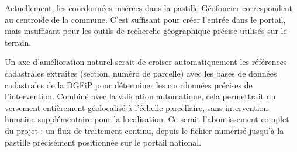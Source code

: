 Actuellement, les coordonnées insérées dans la pastille Géofoncier correspondent au centroïde de la commune. C'est suffisant pour créer l'entrée dans le portail, mais insuffisant pour les outils de recherche géographique précise utilisés sur le terrain.

Un axe d'amélioration naturel serait de croiser automatiquement les références cadastrales extraites (section, numéro de parcelle) avec les bases de données cadastrales de la DGFiP pour déterminer les coordonnées précises de l'intervention. Combiné avec la validation automatique, cela permettrait un versement entièrement géolocalisé à l'échelle parcellaire, sans intervention humaine supplémentaire pour la localisation. Ce serait l'aboutissement complet du projet : un flux de traitement continu, depuis le fichier numérisé jusqu'à la pastille précisément positionnée sur le portail national.
